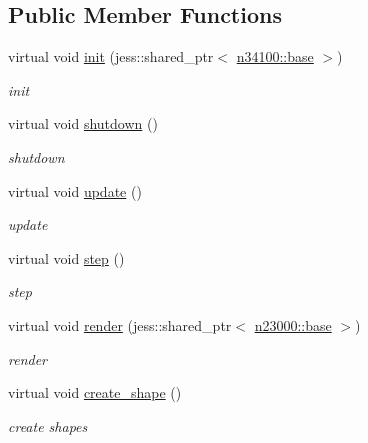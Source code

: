\subsection*{Public Member Functions}
\begin{DoxyCompactItemize}
\item 
virtual void \hyperlink{classnebula_1_1content_1_1actor_1_1renderer_1_1rigid__dynamic__box_a73d0f162b01df6a9f025d51477d37789}{init} (jess::shared\_\-ptr$<$ \hyperlink{classnebula_1_1content_1_1actor_1_1admin_1_1base}{n34100::base} $>$)
\begin{DoxyCompactList}\small\item\em init \item\end{DoxyCompactList}\item 
virtual void \hyperlink{classnebula_1_1content_1_1actor_1_1renderer_1_1rigid__dynamic__box_a45f52d77d1f89e86d5ac3cd2d0beb4c0}{shutdown} ()
\begin{DoxyCompactList}\small\item\em shutdown \item\end{DoxyCompactList}\item 
virtual void \hyperlink{classnebula_1_1content_1_1actor_1_1renderer_1_1rigid__dynamic__box_af93072ba126df030c9eb4ec7d2898104}{update} ()
\begin{DoxyCompactList}\small\item\em update \item\end{DoxyCompactList}\item 
virtual void \hyperlink{classnebula_1_1content_1_1actor_1_1renderer_1_1rigid__dynamic__box_aaf97e5f4b49f87941223bc5ddd87d643}{step} ()
\begin{DoxyCompactList}\small\item\em step \item\end{DoxyCompactList}\item 
virtual void \hyperlink{classnebula_1_1content_1_1actor_1_1renderer_1_1rigid__dynamic__box_af1ee2316e0a03674fbbaea64cf1c4a8b}{render} (jess::shared\_\-ptr$<$ \hyperlink{classnebula_1_1platform_1_1renderer_1_1base}{n23000::base} $>$)
\begin{DoxyCompactList}\small\item\em render \item\end{DoxyCompactList}\item 
virtual void \hyperlink{classnebula_1_1content_1_1actor_1_1renderer_1_1rigid__dynamic__box_a0461e5beff11b0749612523b2f8142b6}{create\_\-shape} ()
\begin{DoxyCompactList}\small\item\em create shapes \item\end{DoxyCompactList}\end{DoxyCompactItemize}
